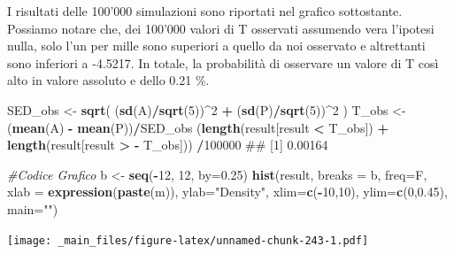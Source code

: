 \documentclass[a4paper,12pt,oneside]{book}
\newenvironment{Shaded}{\begin{snugshade}}{\end{snugshade}}
\newcommand{\KeywordTok}[1]{\textcolor[rgb]{0.13,0.29,0.53}{\textbf{#1}}}
\newcommand{\DataTypeTok}[1]{\textcolor[rgb]{0.13,0.29,0.53}{#1}}
\newcommand{\DecValTok}[1]{\textcolor[rgb]{0.00,0.00,0.81}{#1}}
\newcommand{\FloatTok}[1]{\textcolor[rgb]{0.00,0.00,0.81}{#1}}
\newcommand{\StringTok}[1]{\textcolor[rgb]{0.31,0.60,0.02}{#1}}
\newcommand{\CommentTok}[1]{\textcolor[rgb]{0.56,0.35,0.01}{\textit{#1}}}
\newcommand{\OperatorTok}[1]{\textcolor[rgb]{0.81,0.36,0.00}{\textbf{#1}}}
\newcommand{\NormalTok}[1]{#1}
\theoremstyle{definition}
\theoremstyle{definition}
\theoremstyle{definition}
\theoremstyle{remark}
\begin{document}
I risultati delle 100'000 simulazioni sono riportati nel grafico
sottostante. Possiamo notare che, dei 100'000 valori di T osservati
assumendo vera l'ipotesi nulla, solo l'un per mille sono superiori a
quello da noi osservato e altrettanti sono inferiori a -4.5217. In
totale, la probabilità di osservare un valore di T così alto in valore
assoluto e dello 0.21 \%.

\begin{Shaded}
\begin{Highlighting}[]
\NormalTok{SED_obs <-}\StringTok{ }\KeywordTok{sqrt}\NormalTok{( (}\KeywordTok{sd}\NormalTok{(A)}\OperatorTok{/}\KeywordTok{sqrt}\NormalTok{(}\DecValTok{5}\NormalTok{))}\OperatorTok{^}\DecValTok{2} \OperatorTok{+}
\StringTok{                   }\NormalTok{(}\KeywordTok{sd}\NormalTok{(P)}\OperatorTok{/}\KeywordTok{sqrt}\NormalTok{(}\DecValTok{5}\NormalTok{))}\OperatorTok{^}\DecValTok{2}\NormalTok{ )}
\NormalTok{T_obs <-}\StringTok{ }\NormalTok{(}\KeywordTok{mean}\NormalTok{(A) }\OperatorTok{-}\StringTok{ }\KeywordTok{mean}\NormalTok{(P))}\OperatorTok{/}\NormalTok{SED_obs}
\NormalTok{(}\KeywordTok{length}\NormalTok{(result[result }\OperatorTok{<}\StringTok{ }\NormalTok{T_obs]) }\OperatorTok{+}\StringTok{ }
\StringTok{    }\KeywordTok{length}\NormalTok{(result[result }\OperatorTok{>}\StringTok{ }\OperatorTok{-}\StringTok{ }\NormalTok{T_obs])) }\OperatorTok{/}\DecValTok{100000}
\NormalTok{## [1] 0.00164}
\end{Highlighting}
\end{Shaded}

\begin{Shaded}
\begin{Highlighting}[]
\CommentTok{#Codice Grafico }
\NormalTok{b <-}\StringTok{ }\KeywordTok{seq}\NormalTok{(}\OperatorTok{-}\DecValTok{12}\NormalTok{, }\DecValTok{12}\NormalTok{, }\DataTypeTok{by=}\FloatTok{0.25}\NormalTok{)}
\KeywordTok{hist}\NormalTok{(result, }\DataTypeTok{breaks =}\NormalTok{ b, }\DataTypeTok{freq=}\NormalTok{F, }\DataTypeTok{xlab =} \KeywordTok{expression}\NormalTok{(}\KeywordTok{paste}\NormalTok{(m)), }\DataTypeTok{ylab=}\StringTok{"Density"}\NormalTok{, }\DataTypeTok{xlim=}\KeywordTok{c}\NormalTok{(}\OperatorTok{-}\DecValTok{10}\NormalTok{,}\DecValTok{10}\NormalTok{), }\DataTypeTok{ylim=}\KeywordTok{c}\NormalTok{(}\DecValTok{0}\NormalTok{,}\FloatTok{0.45}\NormalTok{), }\DataTypeTok{main=}\StringTok{""}\NormalTok{)}
\end{Highlighting}
\end{Shaded}

\texttt{[image: \_main\_files/figure-latex/unnamed-chunk-243-1.pdf]}
\end{document}
